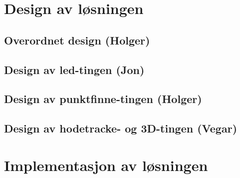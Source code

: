 \section{Design av l\o sningen}

	\subsection{Overordnet design (Holger)}
	
		
	
	\subsection{Design av led-tingen (Jon)}
	
		
	
	\subsection{Design av punktfinne-tingen (Holger)}
	
		
	
	\subsection{Design av hodetracke- og 3D-tingen (Vegar)}
	
		
	
\section{Implementasjon av l\o sningen}

	